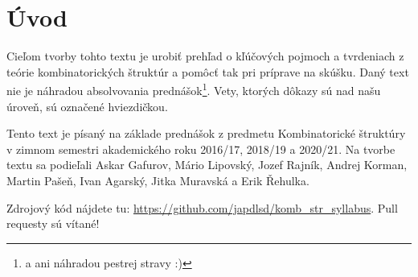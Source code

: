 \chapter*{Úvod}

Cieľom tvorby tohto textu je urobiť prehľad o kľúčových pojmoch a tvrdeniach z teórie kombinatorických štruktúr a pomôcť tak pri príprave na skúšku. 
Daný text nie je náhradou absolvovania prednášok\footnote{a ani náhradou pestrej stravy :)}.
Vety, ktorých dôkazy sú nad našu úroveň, sú označené hviezdičkou.

Tento text je písaný na základe prednášok z predmetu Kombinatorické štruktúry v zimnom semestri akademického roku 2016/17, 2018/19 a 2020/21.
Na tvorbe textu sa podieľali Askar Gafurov, Mário Lipovský, Jozef Rajník, Andrej Korman, Martin Pašeň, Ivan Agarský, Jitka Muravská a Erik Řehulka.


Zdrojový kód nájdete tu: \url{https://github.com/japdlsd/komb_str_syllabus}. Pull requesty sú vítané!

